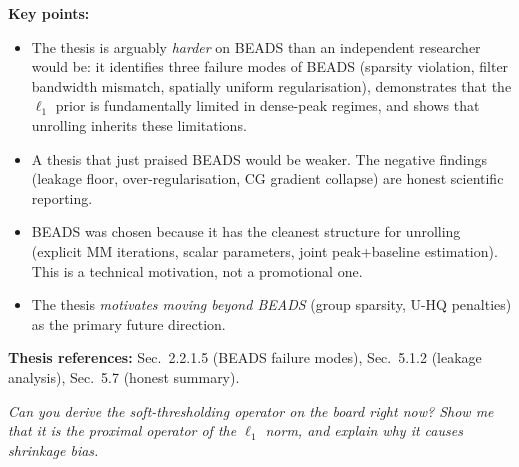 \documentclass[11pt, letterpaper]{article}
\newcounter{qcounter}
\newcommand{\question}[1]{%
  \stepcounter{qcounter}%
  \begin{questionbox}[Q\theqcounter]%
    \itshape #1%
  \end{questionbox}%
}
\begin{document}
\begin{answerbox}
\textbf{Key points:}
\begin{itemize}[nosep]
  \item The thesis is arguably \emph{harder} on BEADS than an
        independent researcher would be: it identifies three failure
        modes of BEADS (sparsity violation, filter bandwidth mismatch,
        spatially uniform regularisation), demonstrates that the
        $\ell_1$ prior is fundamentally limited in dense-peak
        regimes, and shows that unrolling inherits these limitations.
  \item A thesis that just praised BEADS would be weaker.  The
        negative findings (leakage floor, over-regularisation,
        CG gradient collapse) are honest scientific reporting.
  \item BEADS was chosen because it has the cleanest structure for
        unrolling (explicit MM iterations, scalar parameters,
        joint peak+baseline estimation).  This is a technical
        motivation, not a promotional one.
  \item The thesis \emph{motivates moving beyond BEADS}
        (group sparsity, U-HQ penalties) as the primary future
        direction.
\end{itemize}
\textbf{Thesis references:} Sec.~2.2.1.5 (BEADS failure modes), Sec.~5.1.2 (leakage analysis), Sec.~5.7 (honest summary).
\end{answerbox}

\question{Can you derive the soft-thresholding operator on the board right
now?  Show me that it is the proximal operator of the $\ell_1$
norm, and explain why it causes shrinkage bias.}
\end{document}
